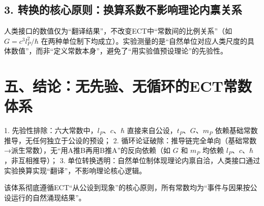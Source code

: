 \documentclass{article}
\begin{document}
\subsection*{3. 转换的核心原则：换算系数不影响理论内禀关系}

人类接口的数值仅为“翻译结果”，不改变ECT中“常数间的比例关系”（如 \( G = c^3 l_P^2/\hbar \) 在两种单位制下均成立）。实验测量的是“自然单位对应人类尺度的具体数值”，而非“定义常数本身”，避免了“用实验值预设理论”的先验性。

\section*{五、结论：无先验、无循环的ECT常数体系}

1. 先验性排除：六大常数中，\( l_P \)、\( c \)、\( \hbar \) 直接来自公设，\( t_P \)、\( G \)、\( m_P \) 依赖基础常数推导，无任何独立于公设的预设；
2. 循环论证破除：推导链完全单向（基础常数→派生常数），无“用A推B再用B推A”的反向依赖（如 \( G \) 和 \( m_P \) 均依赖 \( l_P \)、\( c \)、\( \hbar \)，非互相推导）；
3. 单位转换透明：自然单位制体现理论内禀自洽，人类接口通过实验换算实现“翻译”，不影响理论核心逻辑。

该体系彻底遵循ECT“从公设到现象”的核心原则，所有常数均为“事件与因果按公设运行的自然涌现结果”。
\end{document}
